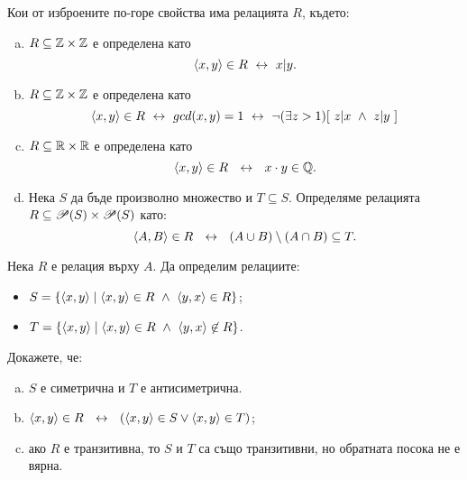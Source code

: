 \begin{problem}
  Кои от изброените по-горе свойства има релацията $R$, където:
  \begin{enumerate}[a)]
  \item
    $R \subseteq \mathbb{Z}\times \mathbb{Z}$ е определена като
    \[\langle{x,y}\rangle \in R \ \leftrightarrow\  x \vert y.\]
  \item
    $R \subseteq \mathbb{Z}\times \mathbb{Z}$ е определена като
    \[\pair{x,y}\in R \iff gcd(x,y) = 1 \iff \neg(\exists z > 1)[\ z\vert x\ \wedge\ z\vert y\ ]\]
  \item
    $R \subseteq \mathbb{R}\times\mathbb{R}$ е определена като
    \[\pair{x,y} \in R\ \iff\ x\cdot y \in \Q.\]
  \item
    Нека $S$ да бъде произволно множество и $T \subseteq S$.
    Определяме релацията $R \subseteq \mathscr{P}(S)\times\mathscr{P}(S)$ като:
    \[\langle{A,B}\rangle\in R\ \ \leftrightarrow\ \ (A\cup B)\setminus(A\cap B) \subseteq T.\]
  \end{enumerate}
\end{problem}


\begin{problem}
  Нека $R$ е релация върху $A$.
  Да определим релациите:
  \begin{itemize}
  \item 
    $S = \{\pair{x,y}\mid \pair{x,y} \in R\ \wedge\ \pair{y,x} \in R\}$;
  \item
    $T = \{\pair{x,y} \mid \pair{x,y}\in R\ \wedge\ \pair{y,x}\not\in R\}$.
  \end{itemize}
  Докажете, че:
  \begin{enumerate}[a)]
  \item 
    $S$ е симетрична и $T$ е антисиметрична.
  \item
    $\langle{x,y}\rangle \in R\ \ \leftrightarrow\ \ (\langle{x,y}\rangle\in S \vee \langle{x,y}\rangle \in T)$;
  \item
    ако $R$ е транзитивна, то $S$ и $T$ са също транзитивни, но обратната посока не е вярна.
  \end{enumerate}
\end{problem}


